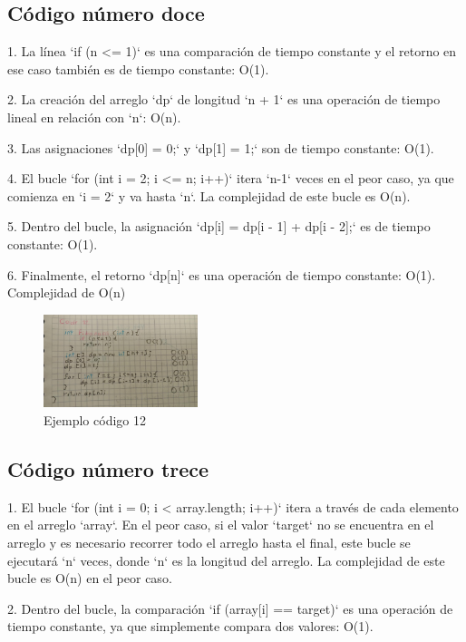 \documentclass[journal, spanish]{IEEEtran}
\begin{document}
\subsection{Código número doce}
1. La línea `if (n <= 1)` es una comparación de tiempo constante y el retorno en ese caso también es de tiempo constante: O(1).

2. La creación del arreglo `dp` de longitud `n + 1` es una operación de tiempo lineal en relación con `n`: O(n).

3. Las asignaciones `dp[0] = 0;` y `dp[1] = 1;` son de tiempo constante: O(1).

4. El bucle `for (int i = 2; i <= n; i++)` itera `n-1` veces en el peor caso, ya que comienza en `i = 2` y va hasta `n`. La complejidad de este bucle es O(n).

5. Dentro del bucle, la asignación `dp[i] = dp[i - 1] + dp[i - 2];` es de tiempo constante: O(1).

6. Finalmente, el retorno `dp[n]` es una operación de tiempo constante: O(1).\\

Complejidad de O(n)


\begin{figure}[H]
  \centering
  \includegraphics[width=0.4\textwidth]{WhatsApp Image 2023-09-11 at 8.02.55 PM.jpeg}
  \caption{Ejemplo código 12}
  \label{fig:imagen1}
\end{figure}

\subsection{Código número trece}
1. El bucle `for (int i = 0; i < array.length; i++)` itera a través de cada elemento en el arreglo `array`. En el peor caso, si el valor `target` no se encuentra en el arreglo y es necesario recorrer todo el arreglo hasta el final, este bucle se ejecutará `n` veces, donde `n` es la longitud del arreglo. La complejidad de este bucle es O(n) en el peor caso.

2. Dentro del bucle, la comparación `if (array[i] == target)` es una operación de tiempo constante, ya que simplemente compara dos valores: O(1).\\
\end{document}
